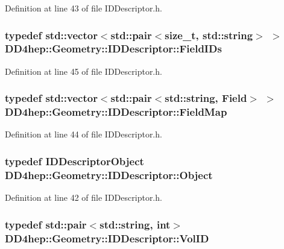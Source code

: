 Definition at line 43 of file IDDescriptor.h.\hypertarget{class_d_d4hep_1_1_geometry_1_1_i_d_descriptor_a0ced4a2fe6dd5775becad359f39a9ee2}{
\subsubsection[{FieldIDs}]{\setlength{\rightskip}{0pt plus 5cm}typedef std::vector$<$std::pair$<$size\_\-t, std::string$>$ $>$ {\bf DD4hep::Geometry::IDDescriptor::FieldIDs}}}
\label{class_d_d4hep_1_1_geometry_1_1_i_d_descriptor_a0ced4a2fe6dd5775becad359f39a9ee2}


Definition at line 45 of file IDDescriptor.h.\hypertarget{class_d_d4hep_1_1_geometry_1_1_i_d_descriptor_ac9d6740c50e0c5cf495486c55e5640d4}{
\subsubsection[{FieldMap}]{\setlength{\rightskip}{0pt plus 5cm}typedef std::vector$<$std::pair$<$std::string, {\bf Field}$>$ $>$ {\bf DD4hep::Geometry::IDDescriptor::FieldMap}}}
\label{class_d_d4hep_1_1_geometry_1_1_i_d_descriptor_ac9d6740c50e0c5cf495486c55e5640d4}


Definition at line 44 of file IDDescriptor.h.\hypertarget{class_d_d4hep_1_1_geometry_1_1_i_d_descriptor_a798e1c3f32519c2161daa79a7c842279}{
\subsubsection[{Object}]{\setlength{\rightskip}{0pt plus 5cm}typedef {\bf IDDescriptorObject} {\bf DD4hep::Geometry::IDDescriptor::Object}}}
\label{class_d_d4hep_1_1_geometry_1_1_i_d_descriptor_a798e1c3f32519c2161daa79a7c842279}


Definition at line 42 of file IDDescriptor.h.\hypertarget{class_d_d4hep_1_1_geometry_1_1_i_d_descriptor_a6928b7adb965c1c276f22f62a0633750}{
\subsubsection[{VolID}]{\setlength{\rightskip}{0pt plus 5cm}typedef std::pair$<$std::string, int$>$ {\bf DD4hep::Geometry::IDDescriptor::VolID}}}
\label{class_d_d4hep_1_1_geometry_1_1_i_d_descriptor_a6928b7adb965c1c276f22f62a0633750}


